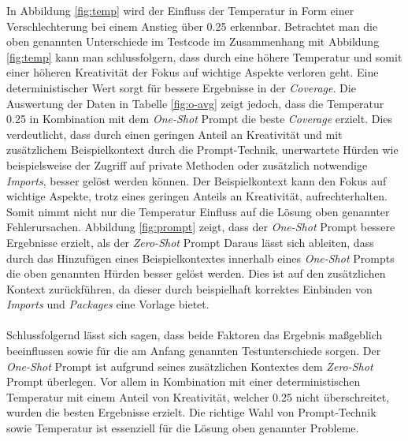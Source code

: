 In Abbildung \ref{fig:temp} wird der Einfluss der Temperatur in Form einer Verschlechterung bei einem Anstieg über 0.25 erkennbar. Betrachtet man die oben genannten Unterschiede im Testcode im Zusammenhang mit Abbildung \ref{fig:temp} kann man schlussfolgern, dass durch eine höhere Temperatur und somit einer höheren Kreativität der Fokus auf wichtige Aspekte verloren geht. Eine deterministischer Wert sorgt für bessere Ergebnisse in der \textit{Coverage}. Die Auswertung der Daten in Tabelle \ref{fig:o-avg} zeigt jedoch, dass die Temperatur 0.25 in Kombination mit dem \textit{One-Shot} Prompt die beste \textit{Coverage} erzielt. Dies verdeutlicht, dass durch einen geringen Anteil an Kreativität und mit zusätzlichem Beispielkontext durch die Prompt-Technik, unerwartete Hürden wie beispielsweise der Zugriff auf private Methoden oder zusätzlich notwendige \textit{Imports}, besser gelöst werden können. Der Beispielkontext kann den Fokus auf wichtige Aspekte, trotz eines geringen Anteils an Kreativität, aufrechterhalten.\\
Somit nimmt nicht nur die Temperatur Einfluss auf die Lösung oben genannter Fehlerursachen. Abbildung \ref{fig:prompt} zeigt, dass der \textit{One-Shot} Prompt bessere Ergebnisse erzielt, als der \textit{Zero-Shot} Prompt Daraus lässt sich ableiten, dass durch das Hinzufügen eines Beispielkontextes innerhalb eines \textit{One-Shot} Prompts die oben genannten Hürden besser gelöst werden. Dies ist auf den zusätzlichen Kontext zurückführen, da dieser durch beispielhaft korrektes Einbinden von \textit{Imports} und \textit{Packages} eine Vorlage bietet.\\\\
Schlussfolgernd lässt sich sagen, dass beide Faktoren das Ergebnis maßgeblich beeinflussen sowie für die am Anfang genannten Testunterschiede sorgen. Der \textit{One-Shot} Prompt ist aufgrund seines zusätzlichen Kontextes dem \textit{Zero-Shot} Prompt überlegen. Vor allem in Kombination mit einer deterministischen Temperatur mit einem Anteil von Kreativität, welcher 0.25 nicht überschreitet, wurden die besten Ergebnisse erzielt. Die richtige Wahl von Prompt-Technik sowie Temperatur ist essenziell für die Lösung oben genannter Probleme.

